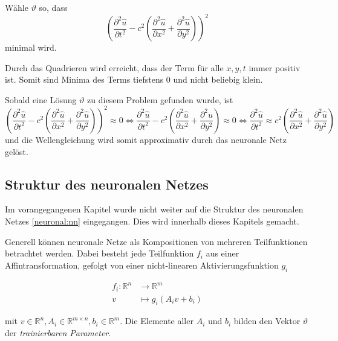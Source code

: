 Wähle \( \vartheta \) so, dass
\begin{equation}
    \left(\frac{\partial^2 \hat{u}}{\partial t^2} - c^2 \left( \frac{\partial^2 \hat{u}}{\partial x^2} + \frac{\partial^2 \hat{u}}{\partial y^2} \right)\right)^2
    \label{neuronal:optimierung}
\end{equation}
minimal wird.\newline

Durch das Quadrieren wird erreicht, dass der Term für alle \( x, y, t \) immer positiv ist.
Somit sind Minima des Terms tiefstens 0 und nicht beliebig klein.

Sobald eine Lösung \( \vartheta \) zu diesem Problem gefunden wurde, ist
\begin{equation}
    \left(\frac{\partial^2 \hat{u}}{\partial t^2} - c^2 \left( \frac{\partial^2 \hat{u}}{\partial x^2} + \frac{\partial^2 \hat{u}}{\partial y^2} \right)\right)^2 \approx 0
    \iff
    \frac{\partial^2 \hat{u}}{\partial t^2} - c^2 \left( \frac{\partial^2 \hat{u}}{\partial x^2} + \frac{\partial^2 \hat{u}}{\partial y^2} \right) \approx 0
    \iff
    \frac{\partial^2 \hat{u}}{\partial t^2} \approx c^2 \left( \frac{\partial^2 \hat{u}}{\partial x^2} + \frac{\partial^2 \hat{u}}{\partial y^2} \right)
\end{equation}
und die Wellengleichung wird somit approximativ durch das neuronale Netz gelöst.


\subsection{Struktur des neuronalen Netzes}\label{neuronal:subsection:struktur_nn}

Im vorangegangenen Kapitel wurde nicht weiter auf die Struktur des neuronalen Netzes \eqref{neuronal:nn} eingegangen.
Dies wird innerhalb dieses Kapitels gemacht.

Generell können neuronale Netze als Kompositionen von mehreren Teilfunktionen betrachtet werden.
Dabei besteht jede Teilfunktion \( f_i \) aus einer Affintransformation, gefolgt von einer nicht-linearen Aktivierungsfunktion \( g_i \)

\begin{align*}
    f_i\colon \mathbb{R}^n & \longrightarrow\mathbb{R}^m \\[-1ex]
    v & \longmapsto g_i(A_iv + b_i)
\end{align*}

mit \( v \in \mathbb{R}^n, A_i \in \mathbb{R}^{m \times n}, b_i \in \mathbb{R}^m \). 
Die Elemente aller \( A_i \) und \( b_i \) bilden den Vektor \( \vartheta \) der \emph{trainierbaren Parameter}.

